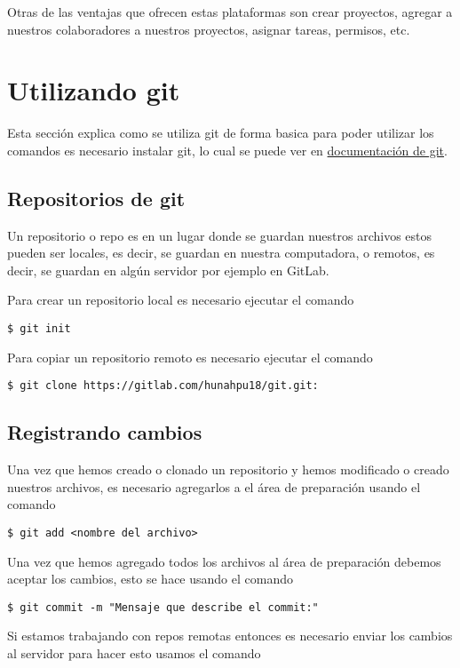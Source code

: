 \documentclass[12pt,a4paper]{article}
\begin{document}
Otras de las ventajas que ofrecen estas plataformas son crear proyectos, agregar a nuestros colaboradores a nuestros proyectos, asignar tareas, permisos, etc.

\section*{Utilizando git}

Esta sección explica como se utiliza git de forma basica para poder utilizar los comandos es necesario instalar git, lo cual se puede ver en \href{https://git-scm.com/downloads}{documentación de git}.

\subsection*{Repositorios de git }
Un repositorio o repo es en un lugar donde se guardan nuestros archivos estos pueden ser locales, es decir, se guardan en nuestra computadora, o remotos, es decir, se guardan en algún servidor por ejemplo en GitLab.

Para crear un repositorio local es necesario ejecutar el comando
\begin{verbatim}
$ git init
\end{verbatim}

Para copiar un repositorio remoto es necesario ejecutar el comando
\begin{verbatim}
$ git clone https://gitlab.com/hunahpu18/git.git:
\end{verbatim}

\subsection*{Registrando cambios}
Una vez que hemos creado o clonado un repositorio y hemos modificado o creado nuestros archivos, es necesario agregarlos a el área de preparación usando el comando
\begin{verbatim}
$ git add <nombre del archivo>
\end{verbatim}

Una vez que hemos agregado todos los archivos al área de preparación debemos aceptar los cambios, esto se hace usando el comando 

\begin{verbatim}
$ git commit -m "Mensaje que describe el commit:"
\end{verbatim}

Si estamos trabajando con repos remotas entonces es necesario enviar los cambios al servidor para hacer esto usamos el comando
\end{document}
